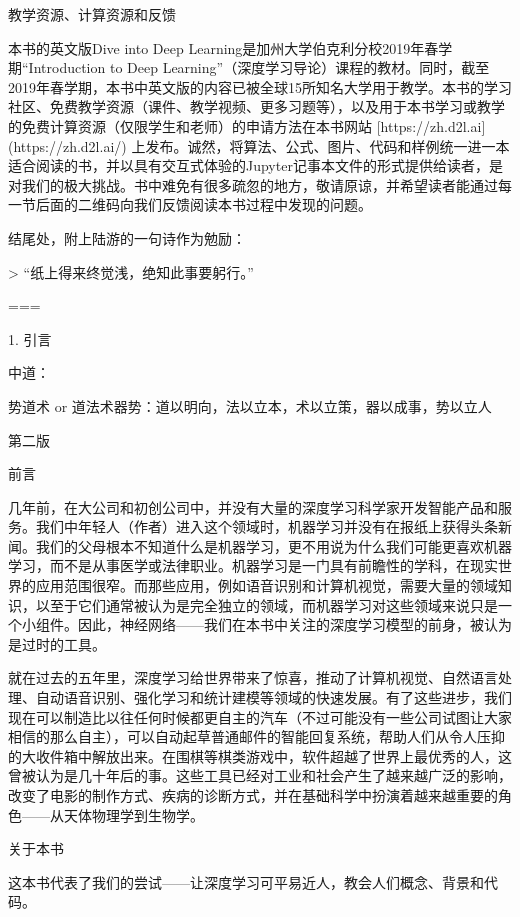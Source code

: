  

 教学资源、计算资源和反馈

本书的英文版Dive into Deep Learning是加州大学伯克利分校2019年春学期“Introduction to Deep Learning”（深度学习导论）课程的教材。同时，截至2019年春学期，本书中英文版的内容已被全球15所知名大学用于教学。本书的学习社区、免费教学资源（课件、教学视频、更多习题等），以及用于本书学习或教学的免费计算资源（仅限学生和老师）的申请方法在本书网站 [https://zh.d2l.ai](https://zh.d2l.ai/) 上发布。诚然，将算法、公式、图片、代码和样例统一进一本适合阅读的书，并以具有交互式体验的Jupyter记事本文件的形式提供给读者，是对我们的极大挑战。书中难免有很多疏忽的地方，敬请原谅，并希望读者能通过每一节后面的二维码向我们反馈阅读本书过程中发现的问题。

结尾处，附上陆游的一句诗作为勉励：

> “纸上得来终觉浅，绝知此事要躬行。”

===

 1. 引言

中道：



势道术 or 道法术器势：道以明向，法以立本，术以立策，器以成事，势以立人





第二版

 前言

几年前，在大公司和初创公司中，并没有大量的深度学习科学家开发智能产品和服务。我们中年轻人（作者）进入这个领域时，机器学习并没有在报纸上获得头条新闻。我们的父母根本不知道什么是机器学习，更不用说为什么我们可能更喜欢机器学习，而不是从事医学或法律职业。机器学习是一门具有前瞻性的学科，在现实世界的应用范围很窄。而那些应用，例如语音识别和计算机视觉，需要大量的领域知识，以至于它们通常被认为是完全独立的领域，而机器学习对这些领域来说只是一个小组件。因此，神经网络——我们在本书中关注的深度学习模型的前身，被认为是过时的工具。

就在过去的五年里，深度学习给世界带来了惊喜，推动了计算机视觉、自然语言处理、自动语音识别、强化学习和统计建模等领域的快速发展。有了这些进步，我们现在可以制造比以往任何时候都更自主的汽车（不过可能没有一些公司试图让大家相信的那么自主），可以自动起草普通邮件的智能回复系统，帮助人们从令人压抑的大收件箱中解放出来。在围棋等棋类游戏中，软件超越了世界上最优秀的人，这曾被认为是几十年后的事。这些工具已经对工业和社会产生了越来越广泛的影响，改变了电影的制作方式、疾病的诊断方式，并在基础科学中扮演着越来越重要的角色——从天体物理学到生物学。

 关于本书

这本书代表了我们的尝试——让深度学习可平易近人，教会人们概念、背景和代码。

